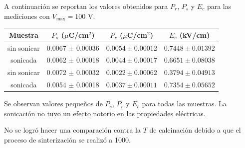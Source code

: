 \documentclass[../main.tex]{subfiles}
\begin{document}
A continuación se reportan los valores obtenidos para $P_r$, $P_s$ y $E_c$ para las mediciones con $V_\text{max}=100$ V.

\begin{table}[H]
    \centering
    \begin{tabular}{|c||c|c|c|}
        \hline
        Muestra & $P_s$ ($\mu$C/cm$^2$) & $P_r$ ($\mu$C/cm$^2$) & $E_c$ (kV/cm) \\
        \hline\hline
        \neod{} sin sonicar & 0.0067 $\pm$ 0.00036 & $0.0054 \pm 0.00012$ & $0.7448 \pm 0.01392$ \\
        \hline
        \neod{} sonicada & 0.0062 $\pm$ 0.00018 & $0.0044 \pm 0.00017$ & $0.6651 \pm 0.08038$ \\
        \hline
        \sama{} sin sonicar & 0.0072 $\pm$ 0.00032 & $0.0022 \pm 0.00062$ & $0.3794 \pm 0.04913$ \\
        \hline
        \sama{} sonicada & 0.0054 $\pm$ 0.00018 & $0.0037 \pm 0.00011$ & $0.7354 \pm 0.05652$ \\
        \hline
        \end{tabular} 
    \label{tabla:respolar}
\end{table}
Se observan valores pequeños de $P_s$, $P_r$ y $E_c$ para todas las muestras. La sonicación no tuvo un efecto notorio en las propiedades eléctricas.

No se logró hacer una comparación contra la $T$ de calcinación debido a que el proceso de sinterización se realizó a 1000\gradoC{}.
\end{document}
